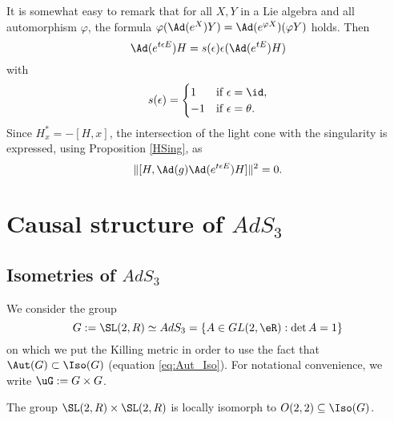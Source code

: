 It is somewhat easy to remark that for all $X,Y$ in a Lie algebra and all automorphism $\varphi$, the formula $\varphi(\Ad(e^X)Y)=\Ad(e^{\varphi X})(\varphi Y)$ holds. Then
\begin{equation}
\Ad(e^{t\epsilon E})H=s(\epsilon)\epsilon(\Ad(e^{tE})H)
\end{equation}
with
\[
  s(\epsilon)=
\begin{cases}
1&\text{if $\epsilon=\id$},\\
-1&\text{if $\epsilon=\theta$}.
\end{cases}
\]
Since $H^*_x=-[H,x]$, the intersection of the light cone with the singularity is expressed, using Proposition \ref{HSing}, as
\begin{equation}
\|[H,\Ad(g)\Ad(e^{t\epsilon E})H]\|^2=0.
\end{equation}

\section{Causal structure of \texorpdfstring{$AdS_3$}{AdS3}}

\subsection{Isometries of \texorpdfstring{$AdS_3$}{AdS3}}

We consider the group
\[
   G:=\SL(2,R)\simeq AdS_3=\{A\in GL(2,\eR):\det A=1\}
\]
on which we put the Killing metric in order to use the fact that $\Aut(G)\subset\Iso(G)$ (equation \eqref{eq:Aut_Iso}). For notational convenience, we write $\uG:=G\times G$.

\begin{lemma}
The group $\SL(2,R)\times\SL(2,R)$ is locally isomorph to $O(2,2)\subseteq \Iso(G)$.
\end{lemma}

